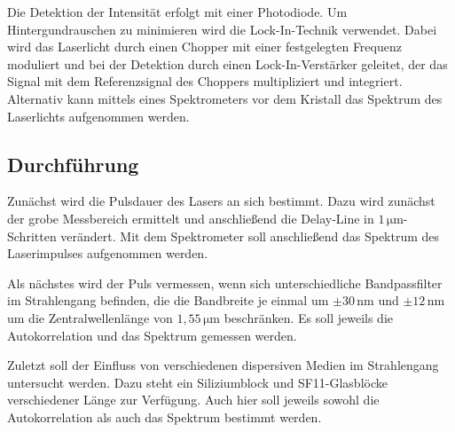 Die Detektion der Intensität erfolgt mit einer Photodiode.
Um Hintergundrauschen zu minimieren wird die Lock-In-Technik verwendet.
Dabei wird das Laserlicht durch einen Chopper mit einer festgelegten Frequenz moduliert
und bei der Detektion durch einen Lock-In-Verstärker geleitet, der das Signal mit dem Referenzsignal des Choppers multipliziert und integriert.
Alternativ kann mittels eines Spektrometers vor dem Kristall das Spektrum des Laserlichts aufgenommen werden.

\subsection{Durchführung}
\label{sec:Durchfuehrung}

Zunächst wird die Pulsdauer des Lasers an sich bestimmt. Dazu wird 
zunächst der grobe Messbereich ermittelt und anschließend die Delay-Line in $1\,\si{\micro\meter}$-Schritten verändert.
Mit dem Spektrometer soll anschließend das Spektrum des Laserimpulses aufgenommen werden.

Als nächstes wird der Puls vermessen, wenn sich unterschiedliche Bandpassfilter im Strahlengang befinden,
die die Bandbreite je einmal um $\pm30\,\si{\nano\meter}$ und $\pm12\,\si{\nano\meter}$ um die Zentralwellenlänge von $1,55\,\si{\micro\meter}$ beschränken.
Es soll jeweils die Autokorrelation und das Spektrum gemessen werden.

Zuletzt soll der Einfluss von verschiedenen dispersiven Medien im Strahlengang untersucht werden.
Dazu steht ein Siliziumblock und SF11-Glasblöcke verschiedener Länge zur Verfügung.
Auch hier soll jeweils sowohl die Autokorrelation als auch das Spektrum bestimmt werden.